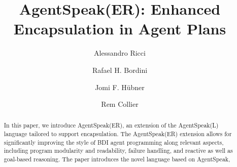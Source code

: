 \documentclass{llncs}
\begin{document}
\title{AgentSpeak(ER): Enhanced Encapsulation in Agent Plans}




\author{Alessandro Ricci \and Rafael H. Bordini \and  Jomi F. H\"ubner \and Rem Collier}


\maketitle

\begin{abstract}  
  In this paper, we introduce AgentSpeak(ER), an extension of the
  AgentSpeak(L) language tailored to support encapsulation. The
  AgentSpeak(ER) extension allows for significantly improving the
  style of BDI agent programming along relevant aspects, including
  program modularity and readability, failure handling, and reactive
  as well as goal-based reasoning. The paper introduces the novel
  language based on AgentSpeak, %
\end{abstract}








% 








\end{document}

